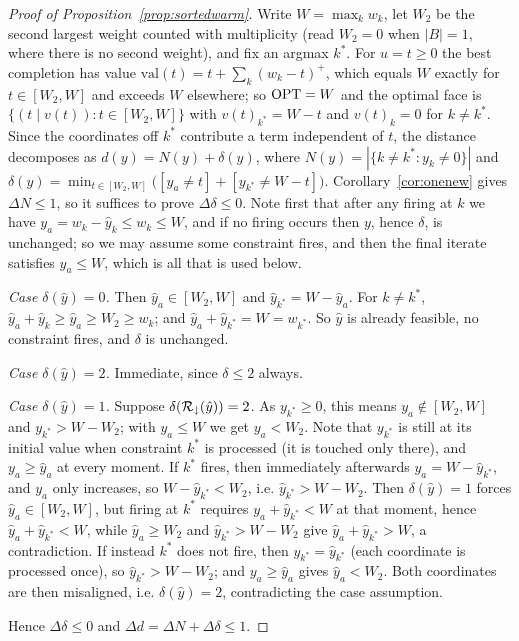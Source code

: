 \begin{proof}[Proof of Proposition~\ref{prop:sortedwarm}]
Write $W = \max_k w_k$, let $W_2$ be the second largest weight counted with multiplicity (read
$W_2 = 0$ when $|B| = 1$, where there is no second weight), and fix an
argmax $k^*$. For $u = t \ge 0$ the best completion has value
$\mathrm{val}(t) = t + \sum_k (w_k - t)^+$, which equals $W$ exactly for $t \in [W_2, W]$ and
exceeds $W$ elsewhere; so $\mathrm{OPT} = W$ and the optimal face is
$\{(t \mid v(t)) : t \in [W_2, W]\}$ with $v(t)_{k^*} = W - t$ and $v(t)_k = 0$ for $k \ne k^*$. Since
the coordinates off $k^*$ contribute a term independent of $t$, the distance decomposes as
$d(y) = N(y) + \delta(y)$, where $N(y) = |\{k \ne k^* : y_k \ne 0\}|$ and
$\delta(y) = \min_{t \in [W_2, W]} \big([y_a \ne t] + [y_{k^*} \ne W - t]\big)$.
Corollary~\ref{cor:onenew} gives $\Delta N \le 1$, so it suffices to prove $\Delta \delta \le 0$.
Note first that after any firing at $k$ we have $y_a = w_k - \hat{y}_k \le w_k \le W$, and if no
firing occurs then $y$, hence $\delta$, is unchanged; so we may assume some constraint fires, and
then the final iterate satisfies $y_a \le W$, which is all that is used below.

\emph{Case $\delta(\hat{y}) = 0$.} Then $\hat{y}_a \in [W_2, W]$ and $\hat{y}_{k^*} = W - \hat{y}_a$.
For $k \ne k^*$, $\hat{y}_a + \hat{y}_k \ge \hat{y}_a \ge W_2 \ge w_k$; and
$\hat{y}_a + \hat{y}_{k^*} = W = w_{k^*}$. So $\hat{y}$ is already feasible, no constraint fires, and
$\delta$ is unchanged.

\emph{Case $\delta(\hat{y}) = 2$.} Immediate, since $\delta \le 2$ always.

\emph{Case $\delta(\hat{y}) = 1$.} Suppose $\delta(\mathcal{R}_\downarrow(\hat{y})) = 2$. As $y_{k^*} \ge 0$,
this means $y_a \notin [W_2, W]$ and $y_{k^*} > W - W_2$; with $y_a \le W$ we get $y_a < W_2$. Note that
$y_{k^*}$ is still at its initial value when constraint $k^*$ is processed (it is touched only
there), and $y_a \ge \hat{y}_a$ at every moment. If $k^*$ fires, then immediately afterwards
$y_a = W - \hat{y}_{k^*}$, and $y_a$ only increases, so $W - \hat{y}_{k^*} < W_2$, i.e.
$\hat{y}_{k^*} > W - W_2$. Then $\delta(\hat{y}) = 1$ forces $\hat{y}_a \in [W_2, W]$, but firing
at $k^*$ requires $y_a + \hat{y}_{k^*} < W$ at that moment, hence
$\hat{y}_a + \hat{y}_{k^*} < W$, while $\hat{y}_a \ge W_2$ and $\hat{y}_{k^*} > W - W_2$ give
$\hat{y}_a + \hat{y}_{k^*} > W$, a contradiction. If instead $k^*$
does not fire, then $y_{k^*} = \hat{y}_{k^*}$ (each coordinate is processed once), so
$\hat{y}_{k^*} > W - W_2$; and $y_a \ge \hat{y}_a$ gives $\hat{y}_a < W_2$. Both coordinates are then
misaligned, i.e. $\delta(\hat{y}) = 2$, contradicting the case assumption.

Hence $\Delta\delta \le 0$ and $\Delta d = \Delta N + \Delta \delta \le 1$.
\end{proof}

